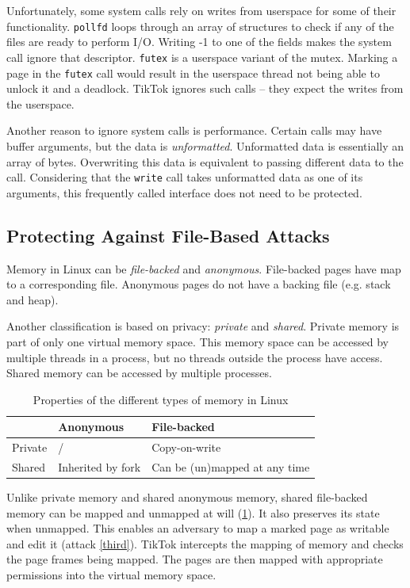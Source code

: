 Unfortunately, some system calls rely on writes from userspace for some of their
functionality. \texttt{pollfd}\cite{pollfd} loops through an array of structures
to check if any of the files are ready to perform I/O. Writing -1 to one of the
fields makes the system call ignore that descriptor. \texttt{futex}\cite{futex}
is a userspace variant of the mutex. Marking a page in the \texttt{futex} call
would result in the userspace thread not being able to unlock it and a deadlock.
TikTok ignores such calls --  they expect the writes from the userspace.

Another reason to ignore system calls is performance. Certain calls may have
buffer arguments, but the data is \emph{unformatted}. Unformatted data is
essentially an array of bytes. Overwriting this data is equivalent to passing
different data to the call. Considering that the \texttt{write} call takes
unformatted data as one of its arguments, this frequently called interface does
not need to be protected.


\subsection{Protecting Against File-Based Attacks}
\label{subsec:filewrites}
Memory in Linux can be \emph{file-backed} and \emph{anonymous}. File-backed 
pages have map to a corresponding file. Anonymous pages do not have a backing 
file (e.g. stack and heap).

Another classification is based on privacy: \emph{private} and \emph{shared}. 
Private memory is part of only one virtual memory space. This memory space can 
be accessed by multiple threads in a process, but no threads outside the process
have access. Shared memory can be accessed by multiple processes.

\begin{table}[]
  \begin{tabular}{|l|l|l|}
  \hline
          & Anonymous         & File-backed                           \\ \hline
  Private & /                 & Copy-on-write                         \\ \hline
  Shared  & Inherited by fork & Can be (un)mapped at any time         \\ \hline
  \end{tabular}
  \caption{Properties of the different types of memory in Linux}
  \label{tab:memory}
\end{table}

Unlike private memory and shared anonymous memory, shared file-backed memory can
be mapped and unmapped at will (\cref{tab:memory}). It also preserves its state
when unmapped. This enables an adversary to map a marked page as writable and
edit it (attack \ref{third}). TikTok intercepts the mapping of memory and checks the
page frames being mapped. The pages are then mapped with appropriate permissions
into the virtual memory space.

